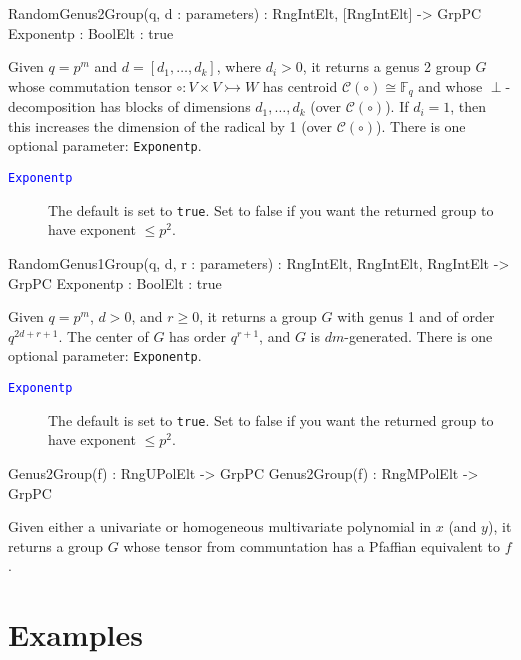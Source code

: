 \documentclass{documentation}
\begin{document}
\begin{intrinsics}
RandomGenus2Group(q, d : parameters) : RngIntElt, [RngIntElt] -> GrpPC
    Exponentp : BoolElt : true
\end{intrinsics}

Given $q=p^m$ and $d=[d_1, \dots, d_k]$, where $d_i>0$, it returns a genus 2 group $G$ whose commutation tensor $\circ : V\times V\rightarrowtail W$ has centroid $\mathcal{C}(\circ)\cong \mathbb{F}_q$ and whose $\perp$-decomposition has blocks of dimensions $d_1,\dots,d_k$ (over $\mathcal{C}(\circ)$).
If $d_i=1$, then this increases the dimension of the radical by 1 (over $\mathcal{C}(\circ)$).
There is one optional parameter: {\tt Exponentp}. 

\begin{description}
\item[\textcolor{blue}{\tt Exponentp}]
The default is set to {\tt true}.
Set to false if you want the returned group to have exponent $\leq p^2$.  
\end{description}

\begin{intrinsics}
RandomGenus1Group(q, d, r : parameters) : RngIntElt, RngIntElt, RngIntElt -> GrpPC
    Exponentp : BoolElt : true
\end{intrinsics}

Given $q=p^m$, $d>0$, and $r\geq 0$, it returns a group $G$ with genus 1 and of order $q^{2d+r+1}$.
The center of $G$ has order $q^{r+1}$, and $G$ is $dm$-generated.
There is one optional parameter: {\tt Exponentp}. 

\begin{description}
\item[\textcolor{blue}{\tt Exponentp}]
The default is set to {\tt true}.
Set to false if you want the returned group to have exponent $\leq p^2$.  
\end{description}

\begin{intrinsics}
Genus2Group(f) : RngUPolElt -> GrpPC
Genus2Group(f) : RngMPolElt -> GrpPC
\end{intrinsics}

Given either a univariate or homogeneous multivariate polynomial in $x$ (and $y$), it returns a group $G$ whose tensor from communtation has a Pfaffian equivalent to $f$.

\section{Examples}
\end{document}
